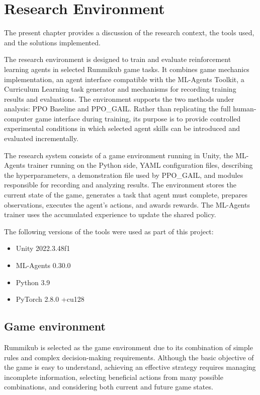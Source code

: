 

\chapter{Research Environment}
\label{chapt::Subject}
The present chapter provides a discussion of the research context, the tools used, and the solutions implemented. 

The research environment is designed to train and evaluate reinforcement learning agents in selected Rummikub game tasks. It combines game mechanics implementation, an agent interface compatible with the ML-Agents Toolkit, a Curriculum Learning task generator and mechanisms for recording training results and evaluations. The environment supports the two methods under analysis: PPO Baseline and PPO\_GAIL. Rather than replicating the full human-computer game interface during training, its purpose is to provide controlled experimental conditions in which selected agent skills can be introduced and evaluated incrementally.

The research system consists of a game environment running in Unity, the ML-Agents trainer running on the Python side, YAML configuration files, describing the hyperparameters, a demonstration file used by PPO\_GAIL, and modules responsible for recording and analyzing results. The environment stores the current state of the game, generates a task that agent must complete, prepares observations, executes the agent’s actions, and awards rewards. The ML-Agents trainer uses the accumulated experience to update the shared policy.

The following versions of the tools were used as part of this project:
\begin{itemize}
	\item Unity 2022.3.48f1
	\item ML-Agents 0.30.0
	\item Python 3.9
	\item PyTorch 2.8.0 +cu128
\end{itemize}

\section{Game environment}

Rummikub is selected as the game environment due to its combination of simple rules and complex decision-making requirements. Although the basic objective of the game is easy to understand, achieving an effective strategy requires managing incomplete information, selecting beneficial actions from many possible combinations, and considering both current and future game states.

